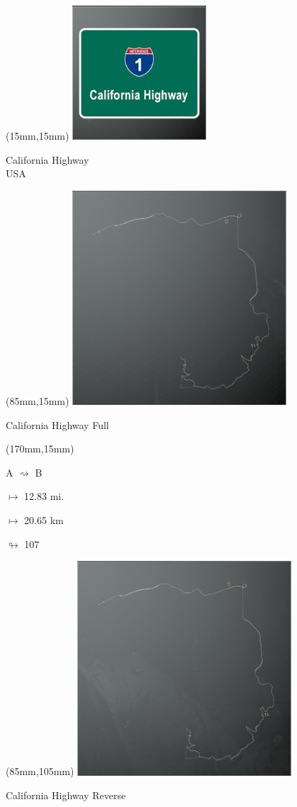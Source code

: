 \begin{textblock*}{60mm}(15mm,15mm)%
\includegraphics[width=50mm]{LG/2015-05-20_00077.png}
\par California Highway\\ USA
\end{textblock*}
\begin{textblock*}{80mm}(85mm,15mm)%
\includegraphics[width=80mm]{TR/2015-05-20_00013.png}
\centerline{California Highway Full}
\end{textblock*}
\begin{textblock*}{30mm}(170mm,15mm)%
\par A $\rightsquigarrow$ B
\Large
\par$\mapsto$ 12.83 mi.
\par$\mapsto$ 20.65 km
\par$\looparrowright$ 107
\end{textblock*}
\begin{textblock*}{80mm}(85mm,105mm)%
\includegraphics[width=80mm]{TR/2015-05-20_00017.png}
\centerline{California Highway Reverse}
\end{textblock*}

